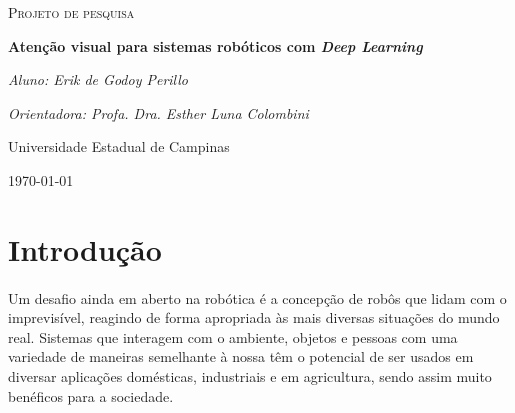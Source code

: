 \documentclass[11pt]{article}
\newcommand{\tit}[1]{\textit{#1}}
\begin{document}
\begin{titlepage}
	\centering
	{\scshape\Large Projeto de pesquisa\par}
	\vspace{1.5cm}
	{\huge \bfseries Atenção visual para sistemas robóticos
        com \tit{Deep Learning}\par}
	\vspace{1cm}
	{\itshape Aluno: Erik de Godoy Perillo\par}
	{\itshape Orientadora: Profa. Dra. Esther Luna Colombini\par}
	\vspace{0.5cm}
	\begin{abstract}
        A informação visual é um elemento-chave no processo de entender
        o ambiente em que um ser se encontra.
        Para sistemas robóticos isso também é verdade.
		No entanto, a alta dimensionalidade dos dados captados por câmeras
		usadas para este fim é em geral problemática, muitas vezes havendo
		redundância e irrelevância de informação.
		Nos seres humanos este filtro sensorial é realizado pela Atenção.
		Neste contexto, este projeto propõe a aplicação de
        \tit{Deep Learning} para a obtenção de sistemas de saliência visual
        para sistemas robóticos.
        Este trabalho dá continuidade ao trabalho anterior, onde as técnicas
        mais recentes para abordar o problema foram avaliadas, focando-se em um
        novo modelo competitivo com os atuais e otimizado
        para o domínio de robótica.
        Neste trabalho, visamos a extensão do modelo para fluxos contínuos de
        imagem, representados por vídeo.
	\end{abstract}
	\vfill
	Universidade Estadual de Campinas
	\vfill
	{\large \today\par}
\end{titlepage}

\newpage

\section{Introdução}
\paragraph{}
Um desafio ainda em aberto na robótica é a concepção de robôs que lidam com
o imprevisível, reagindo de forma apropriada às mais diversas situações
do mundo real.
Sistemas que interagem com o ambiente, objetos e pessoas
com uma variedade de maneiras semelhante à nossa têm o potencial de ser
usados em diversar aplicações domésticas, industriais e em agricultura,
sendo assim muito benéficos para a sociedade.
\end{document}
